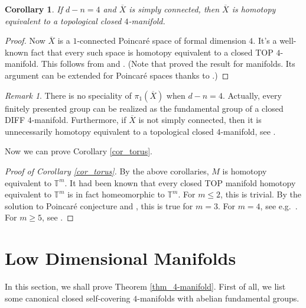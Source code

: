 \documentclass[12pt]{amsart}
\theoremstyle{plain}
\newtheorem{corollary}[theorem]{Corollary}
\theoremstyle{definition}
\theoremstyle{question}
\theoremstyle{remark}
\newtheorem{remark}[theorem]{Remark}
\theoremstyle{assumption}
\numberwithin{equation}{section}
\theoremstyle{bigthm}
\begin{document}
\begin{corollary}\label{cor_Poincare-4}
If $d-n=4$ and $\overline{X}$ is simply connected, then $\overline{X}$ is homotopy equivalent to a topological closed $4$-manifold.
\end{corollary}
\begin{proof}
Now $\overline{X}$ is a $1$-connected Poincar\'{e} space of formal dimension $4$. It's a well-known fact that every such space is homotopy equivalent to a closed TOP $4$-manifold. This follows from \cite[p.~161,~Theorem]{Freedman_Quinn} and \cite[p.~103,~Theorem.~1.5]{MH}. (Note that \cite{MH} proved the result for manifolds. Its argument can be extended for Poincar\'e spaces thanks to \cite[Theorem~2.4]{Wall67}.)
\end{proof}

\begin{remark}
There is no speciality of $\pi_{1} (\overline{X})$ when $d-n=4$. Actually, every finitely presented group can be realized as the fundamental group of a closed DIFF $4$-manifold. Furthermore, if $\overline{X}$ is not simply connected, then it is unnecessarily homotopy equivalent to a topological closed $4$-manifold, see \cite[Corollaries~5.4.1~\&~5.4.2]{Wall67}.
\end{remark}

Now we can prove Corollary \ref{cor_torus}.
\begin{proof}[Proof of Corollary \ref{cor_torus}]
By the above corollaries, $M$ is homotopy equivalent to $\mathbb{T}^{m}$. It had been known that every closed TOP manifold homotopy equivalent to $\mathbb{T}^{m}$ is in fact homeomorphic to $\mathbb{T}^{m}$. For $m \le 2$, this is trivial. By the solution to Poincar\'{e} conjecture and \cite[Main~Theorem]{Luft_Sjerve}, this is true for $m=3$. For $m=4$, see e.g.~\cite[\S~11.5]{Freedman_Quinn}. For $m \ge 5$, see \cite[Theorem~A]{Farrell_Hsiang}.
\end{proof}

\section{Low Dimensional Manifolds}\label{sec_low_dim}
In this section, we shall prove Theorem \ref{thm_4-manifold}. First of all, we list some canonical closed self-covering $4$-manifolds with abelian fundamental groups.
\end{document}
